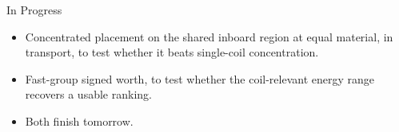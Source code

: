 \documentclass[aspectratio=169]{beamer}
\begin{document}
\begin{frame}{In Progress}
  \begin{itemize}
    \item Concentrated placement on the shared inboard region at equal material, in transport, to test whether it beats single-coil concentration.
    \item Fast-group signed worth, to test whether the coil-relevant energy range recovers a usable ranking.
    \item Both finish tomorrow.
  \end{itemize}
\end{frame}
\end{document}
